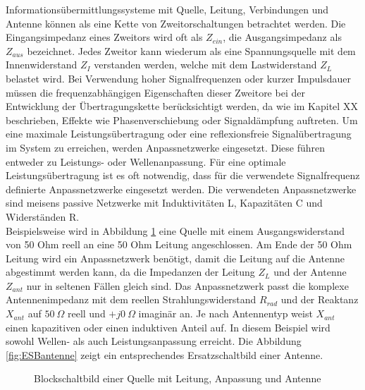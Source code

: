 Informationsübermittlungssysteme mit Quelle, Leitung, Verbindungen und Antenne können als eine Kette von Zweitorschaltungen betrachtet werden. Die Eingangsimpedanz eines Zweitors wird oft als $Z_{ein}$, die Ausgangsimpedanz als $Z_{aus}$ bezeichnet. 
Jedes Zweitor kann wiederum als eine Spannungsquelle mit dem Innenwiderstand $Z_I$ verstanden werden, welche mit dem Lastwiderstand $Z_L$ belastet wird. Bei Verwendung hoher Signalfrequenzen oder kurzer Impulsdauer müssen die frequenzabhängigen Eigenschaften dieser Zweitore bei der Entwicklung der Übertragungskette berücksichtigt werden, da wie im Kapitel XX beschrieben, Effekte wie Phasenverschiebung oder Signaldämpfung auftreten. Um eine maximale Leistungsübertragung oder eine reflexionsfreie Signalübertragung im System zu erreichen, werden Anpassnetzwerke eingesetzt. Diese führen entweder zu Leistungs- oder Wellenanpassung. Für eine optimale Leistungsübertragung ist es oft notwendig, dass für die verwendete Signalfrequenz definierte Anpassnetzwerke eingesetzt werden. Die verwendeten Anpassnetzwerke sind meisens passive Netzwerke mit Induktivitäten L, Kapazitäten C und Widerständen R.\\

Beispielsweise wird in Abbildung \ref{fig:Anpassung} eine Quelle mit einem Ausgangswiderstand von 50 Ohm reell an eine 50 Ohm Leitung angeschlossen. Am Ende der 50 Ohm Leitung wird ein Anpassnetzwerk benötigt, damit die Leitung auf die Antenne abgestimmt werden kann, da die Impedanzen der Leitung $Z_L$ und der Antenne $Z_{ant}$ nur in seltenen Fällen gleich sind. Das Anpassnetzwerk passt die komplexe Antennenimpedanz mit dem reellen Strahlungswiderstand $R_{rad}$ und der Reaktanz $X_{ant}$ auf $50\ \Omega$ reell und $+j0\ \Omega$ imaginär an. Je nach Antennentyp weist $X_{ant}$ einen kapazitiven oder einen induktiven Anteil auf. In diesem Beispiel wird sowohl Wellen- als auch Leistungsanpassung erreicht. Die Abbildung \ref{fig:ESBantenne} zeigt ein entsprechendes Ersatzschaltbild einer Antenne.\\


\begin{figure}[!ht]
	\begin{center}
	\end{center}
\caption{Blockschaltbild einer Quelle mit Leitung, Anpassung und Antenne}
\label{fig:Anpassung}
\end{figure}


